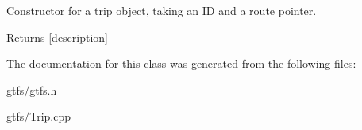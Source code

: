 Constructor for a trip object, taking an ID and a route pointer. \begin{DoxyReturn}{Returns}
\mbox{[}description\mbox{]} 
\end{DoxyReturn}


The documentation for this class was generated from the following files\+:\begin{DoxyCompactItemize}
\item 
gtfs/gtfs.\+h\item 
gtfs/Trip.\+cpp\end{DoxyCompactItemize}
